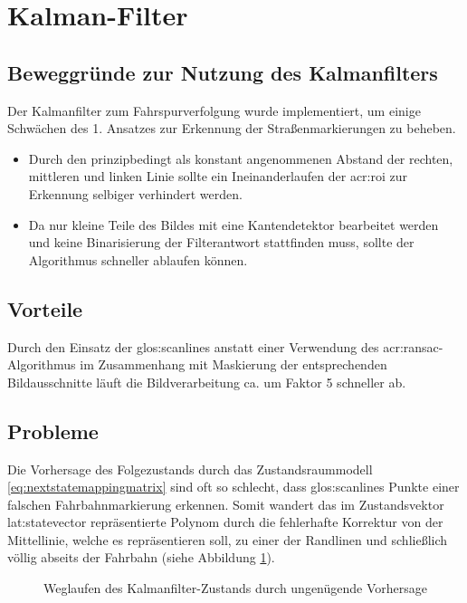 \section{Kalman-Filter}

\subsection{Beweggründe zur Nutzung des Kalmanfilters}
Der Kalmanfilter zum Fahrspurverfolgung wurde implementiert, um einige Schwächen des 1. Ansatzes zur Erkennung der Straßenmarkierungen zu beheben.
\begin{itemize}
\item Durch den prinzipbedingt als konstant angenommenen Abstand der rechten, mittleren und linken Linie sollte ein \glqq Ineinanderlaufen \grqq der \gls{acr:roi} zur Erkennung selbiger verhindert werden.
\item Da nur kleine Teile des Bildes mit eine Kantendetektor bearbeitet werden und keine Binarisierung der Filterantwort stattfinden muss, sollte der Algorithmus schneller ablaufen können.
\end{itemize}

\subsection{Vorteile}
Durch den Einsatz der \gls{glos:scanline}s anstatt einer Verwendung des \gls{acr:ransac}-Algorithmus im Zusammenhang mit Maskierung der entsprechenden Bildausschnitte läuft die Bildverarbeitung ca. um Faktor 5 schneller ab.

\subsection{Probleme}
Die Vorhersage des Folgezustands durch das Zustandsraummodell \eqref{eq:nextstatemappingmatrix} sind oft so schlecht, dass \gls{glos:scanline}s Punkte einer falschen Fahrbahnmarkierung erkennen. Somit \glqq wandert \grqq das im Zustandsvektor \gls{lat:statevector} repräsentierte Polynom durch die fehlerhafte Korrektur von der Mittellinie, welche es repräsentieren soll, zu einer der Randlinen und schließlich völlig abseits der Fahrbahn (siehe Abbildung \ref{fig:evaluation:kalman:weggezogen}).

\begin{figure}[ht] %
	\centering
	\qquad
	\qquad
	\caption{\glqq Weglaufen \grqq des Kalmanfilter-Zustands durch ungenügende Vorhersage}
	\label{fig:evaluation:kalman:weggezogen}
\end{figure}

